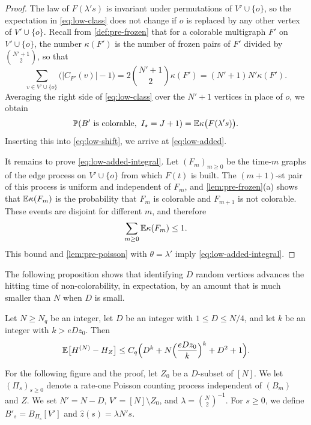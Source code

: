 \begin{proof}
The law of $F(\lambda' s)$ is invariant under permutations of $V' \cup \{o\}$, so the expectation in \eqref{eq:low-class} does not change if $o$ is replaced by any other vertex of $V' \cup \{o\}$. Recall from \cref{def:pre-frozen} that for a colorable multigraph $F'$ on $V' \cup \{o\}$, the number $\kappa(F')$ is the number of frozen pairs of $F'$ divided by $\binom{N' + 1}{2}$, so that
\begin{equation*}
\sum_{v \in V' \cup \{o\}} \bigl(|C_{F'}(v)| - 1\bigr) = 2 \binom{N' + 1}{2} \kappa(F') = (N' + 1) N' \kappa(F').
\end{equation*}
Averaging the right side of \eqref{eq:low-class} over the $N' + 1$ vertices in place of $o$, we obtain
\begin{equation*}
\Pp(B' \text{ is colorable}, \ I_\star = J + 1) = \E \kappa\bigl(F(\lambda' s)\bigr).
\end{equation*}
Inserting this into \eqref{eq:low-shift}, we arrive at \eqref{eq:low-added}.

It remains to prove \eqref{eq:low-added-integral}. Let $(F_m)_{m \ge 0}$ be the time-$m$ graphs of the edge process on $V' \cup \{o\}$ from which $F(t)$ is built. The $(m + 1)$-st pair of this process is uniform and independent of $F_m$, and \cref{lem:pre-frozen}(a) shows that $\mathbb E \kappa(F_m)$ is the probability that $F_m$ is colorable and $F_{m + 1}$ is not colorable. These events are disjoint for different $m$, and therefore
\begin{equation*}
\sum_{m \ge 0} \mathbb E \kappa(F_m) \le 1.
\end{equation*}
This bound and \cref{lem:pre-poisson} with $\theta = \lambda'$ imply \eqref{eq:low-added-integral}.
\end{proof}

The following proposition shows that identifying $D$ random vertices advances the hitting time of non-colorability, in expectation, by an amount that is much smaller than $N$ when $D$ is small.

\begin{proposition}\label{prop:low-identify}
Let $N \ge N_q$ be an integer, let $D$ be an integer with $1 \le D \le N/4$, and let $k$ be an integer with $k > e D z_0$. Then
\begin{equation}\label{eq:low-identify}
\mathbb E\bigl[H^{(N)} - H_Z\bigr] \le C_q \Bigl(D^k + N \Bigl(\frac{e D z_0}{k}\Bigr)^k + D^2 + 1\Bigr).
\end{equation}
\end{proposition}

For the following figure and the proof, let $Z_0$ be a $D$-subset of $[N]$. We let $(\Pi_s)_{s \ge 0}$ denote a rate-one Poisson counting process independent of $(B_m)$ and $Z$. We set $N' = N - D$, $V' = [N] \setminus Z_0$, and $\lambda = \binom{N}{2}^{-1}$. For $s \ge 0$, we define $B'_s = B_{\Pi_s}[V']$ and $\hat z(s) = \lambda N' s$.

